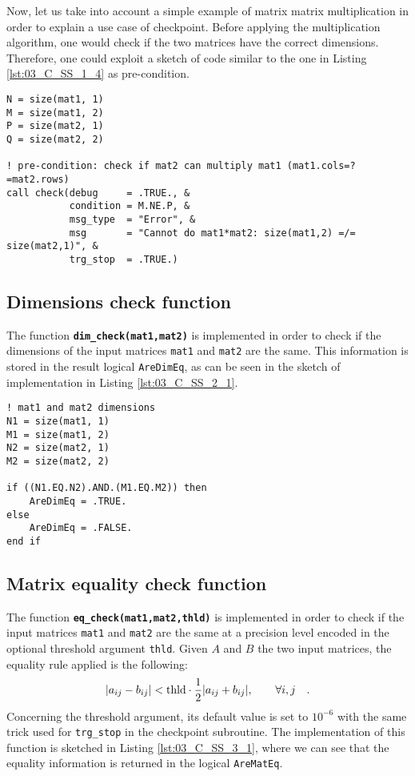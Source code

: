 \documentclass[pra, onecolumn, notitlepage, floats, 11pt]{revtex4-1}
\newcommand{\code}[2][black]{\color{#1}\texttt{#2}}
\newcommand{\codefunctionbold}[2]{\texttt{\bfseries {\color{cobalt}#1}({\color{lava}#2})}}
\begin{document}
Now, let us take into account a simple example of matrix matrix multiplication in order to explain a use case of checkpoint. Before applying the multiplication algorithm, one would check if the two matrices have the correct dimensions. Therefore, one could exploit a sketch of code similar to the one in Listing \ref{lst:03_C_SS_1_4} as pre-condition.

\begin{lstlisting}[frame=single,label={lst:03_C_SS_1_4},caption={Example of application of check subroutine to matrix matrix multiplication.}]
N = size(mat1, 1)
M = size(mat1, 2)
P = size(mat2, 1)
Q = size(mat2, 2)

! pre-condition: check if mat2 can multiply mat1 (mat1.cols=?=mat2.rows)
call check(debug     = .TRUE., &
           condition = M.NE.P, &
           msg_type  = "Error", &
           msg       = "Cannot do mat1*mat2: size(mat1,2) =/= size(mat2,1)", &
           trg_stop  = .TRUE.)
\end{lstlisting}



\subsection{Dimensions check function}
\label{ssec:C_SS_2}
The function \codefunctionbold{dim\_check}{mat1,mat2} is implemented in order to check if the dimensions of the input matrices \code{mat1} and \code{mat2} are the same. This information is stored in the result logical \code{AreDimEq}, as can be seen in the sketch of implementation in Listing \ref{lst:03_C_SS_2_1}.
\begin{lstlisting}[frame=single,label={lst:03_C_SS_2_1},caption={Sketch of the implementation of \codefunctionbold{dim\_check}{mat1,mat2} function for dimension check.}]
! mat1 and mat2 dimensions
N1 = size(mat1, 1)
M1 = size(mat1, 2)
N2 = size(mat2, 1)
M2 = size(mat2, 2)

if ((N1.EQ.N2).AND.(M1.EQ.M2)) then
    AreDimEq = .TRUE.
else
    AreDimEq = .FALSE.
end if
\end{lstlisting}



\subsection{Matrix equality check function}
\label{ssec:C_SS_3}
The function \codefunctionbold{eq\_check}{mat1,mat2,thld} is implemented in order to check if the input matrices \code{mat1} and \code{mat2} are the same at a precision level encoded in the optional threshold argument \code{thld}. Given \( A \) and \( B \) the two input matrices, the equality rule applied is the following:
\begin{equation}
    \abs{a_{ij} - b_{ij}}
    <
    \text{thld} \cdot \frac{1}{2} \abs{a_{ij} + b_{ij}},
    \qquad
    \forall i,j \quad .
\end{equation}
Concerning the threshold argument, its default value is set to \( 10^{-6} \) with the same trick used for \code{trg\_stop} in the checkpoint subroutine. The implementation of this function is sketched in Listing \ref{lst:03_C_SS_3_1}, where we can see that the equality information is returned in the logical \code{AreMatEq}.
\end{document}
